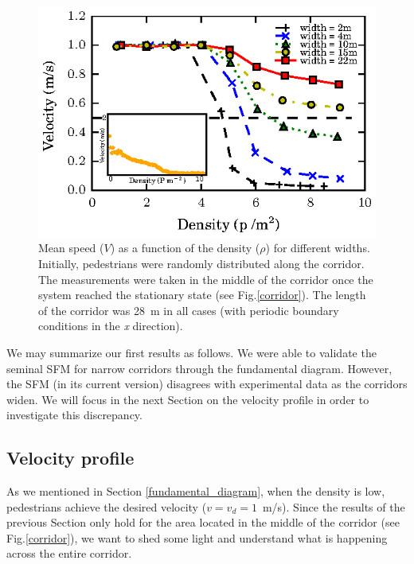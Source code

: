 \begin{figure}[htbp!]
\includegraphics[width=\columnwidth]
{plots/speed-density_vd1_multiple_widths.eps}
\caption{\label{fundamental_diagram_speed} Mean speed ($V$) as a function of the density ($\rho$) for different widths. Initially, 
pedestrians were randomly distributed along the corridor. The measurements were taken in the middle
of the corridor once the system reached the stationary state (see Fig.\ref{corridor}). The length of the corridor 
was 28~m in all cases (with periodic boundary conditions in the \textit{x} direction).}
\end{figure}

We may summarize our first results as follows. We were able to validate the seminal SFM for narrow corridors through the fundamental diagram. However, the SFM (in its current version) disagrees with experimental data as the corridors widen. We will focus in the next Section on the velocity profile in order to investigate this discrepancy. 

\subsection{\label{velocity_profile} Velocity profile}

As we mentioned in Section \ref{fundamental_diagram}, when the density is low, pedestrians achieve the desired velocity ($v=v_d=1$~m/s). Since the results of the previous Section only hold for the area located in the middle of the corridor (see Fig.\ref{corridor}), we want to shed some light and understand what is happening across the entire corridor.\\

